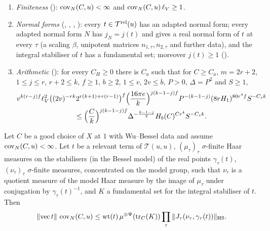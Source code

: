 \begin{enumerate}[label=(A\arabic*)]
for every normal form $N$ adapted to $(F_u,F_t)$ and normal-form stabiliser measures $\mu_\tau$ (of scale $1$) and every
fundamental set $K$,
\[
\mu^{\otimes\Psi}(\mathrm{tr}(K))\le\omega_N(\Lambda_t)\,v^{k(r-j_N)f}\,\ell_V,\qquad \ell_V=(8v)^{2(r+1)^2f}.
\]
\item\label{pf:sh-flag:A7} \emph{Finiteness} ():
$\operatorname{cov}_N(C,u)<\infty$ and $\operatorname{cov}_N(C,u)\,\ell_V\ge1$.
\item\label{pf:sh-flag:A8} \emph{Normal forms} (,
, ,
): every $t\in\mathcal T^{\mathrm{rel}}(u)$ has an adapted normal form;
every adapted normal form $N$ has $j_N=j(t)$ and gives a real normal form of $t$ at every $\tau$ (a scaling $\beta$, unipotent
matrices $n_{1,\tau},n_{2,\tau}$ and further data), and the integral stabiliser of $t$ has a fundamental set; moreover $j(t)\ge1$
().
\item\label{pf:sh-flag:A9} \emph{Arithmetic} (): for every $C_H\ge0$ there is $C_a$
such that for $C\ge C_a$, $m=2r+2$, $1\le j\le r$, $r+2\le k$, $f\ge1$, $b\ge2$, $1\le v$, $2v\le b$, $P>0$, $\Delta=P^2$ and $S\ge1$,
\begin{multline*}
v^{k(r-j)f}\ell_V^2\bigl((2v)^{-rk}2^{r(k+1)+r(r-1)}\bigr)^f\Bigl(\frac{16\pi e}k\Bigr)^{j(k-1-j)f}P^{-(k-1-j)}(8rH_1)^{80r^4f}S^{-C_sk}\\
\le\Bigl(\frac Ck\Bigr)^{j(k-1-j)f}\Delta^{-\frac{k-1-j}2}H_b(C)^{Cr^4}S^{-C_sk}.
\end{multline*}
\end{enumerate}

\begin{lemma}\label{pf:sh-flag:fact}
Let $C$ be a good choice of $X$ at $1$ with Wu--Bessel data and assume $\operatorname{cov}_N(C,u)<\infty$. Let $t$ be a relevant term of
$\mathcal T(u,u)$, $(\mu_\tau)_\tau$ $\sigma$-finite Haar measures on the stabilisers (in the Bessel model) of the real points
$\gamma_\tau(t)$, $(\nu_\tau)_\tau$ $\sigma$-finite measures, concentrated on the model group, such that $\nu_\tau$ is a quotient measure
of the model Haar measure by the image of $\mu_\tau$ under conjugation by $\gamma_\tau(t)^{-1}$, and $K$ a fundamental set for the
integral stabiliser of $t$. Then
\[
\|\mathrm{vec}\,t\|\,\operatorname{cov}_N(C,u)\le\mathrm{wt}(t)\,\mu^{\otimes\Psi}(\mathrm{tr}_C(K))\prod_\tau\|J_\tau(\nu_\tau,\gamma_\tau(t))\|_{\mathrm{HS}}.
\]
\end{lemma}

